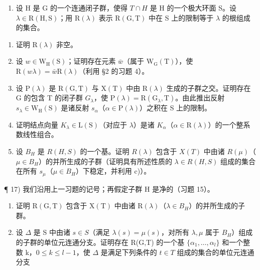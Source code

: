 \begin{enumerate}
\def\labelenumi{\arabic{enumi})}
\setcounter{enumi}{15}
\tightlist
\item
  设 H 是 G 的一个连通闭子群，使得 \(T \cap H\) 是 H 的一个极大环面 S。设 \(\lambda \in \mathrm{R}(\mathrm{H}, \mathrm{S})\)；用 \(\mathrm{R}(\lambda)\) 表示 \(\mathrm{R}(\mathrm{G}, \mathrm{T})\) 中在 S 上的限制等于 \(\lambda\) 的根组成的集合。
\end{enumerate}

\begin{enumerate}
\def\labelenumi{\alph{enumi})}
\item
  证明 \(\mathrm{R}(\lambda)\) 非空。
\item
  设 \(w \in \mathrm{W}_{\mathrm{H}}(\mathrm{S})\)；证明存在元素 \(\bar{w}\)（属于 \(\mathrm{W}_{\mathrm{G}}(\mathrm{T})\)），使 \(\mathrm{R}(w\lambda) = \bar{w}\mathrm{R}(\lambda)\)（利用 §2 的习题 4）。
\item
  设 \(\mathrm{P}(\lambda)\) 是 \(\mathrm{R}(\mathrm{G},\mathrm{T})\) 与 \(\mathrm{X}(\mathrm{T})\) 中由 \(\mathrm{R}(\lambda)\) 生成的子群之交。证明存在 G 的包含 T 的闭子群 \(G_{\lambda}\)，使 \(\mathrm{P}(\lambda)=\mathrm{R}(\mathrm{G}_{\lambda},\mathrm{T})\)。由此推出反射 \(s_{\lambda}\in\mathrm{W}_{\mathrm{H}}(\mathrm{S})\) 是诸反射 \(s_{\alpha}\)（\(\alpha\in\mathrm{P}(\lambda)\)）之积在 S 上的限制。
\item
  证明结点向量 \(K_{\lambda} \in \mathrm{L}(\mathrm{S})\)（对应于 \(\lambda\)）是诸 \(K_{\alpha}\)（\(\alpha \in \mathrm{R}(\lambda)\)）的一个整系数线性组合。
\item
  设 \(B_{H}\) 是 \(R(H,S)\) 的一个基。证明 \(R(\lambda)\) 包含于 \(X(T)\) 中由诸 \(R(\mu)\)（\(\mu \in B_{H}\)）的并所生成的子群（证明具有所述性质的 \(\lambda \in R(H,S)\) 组成的集合在所有 \(s_{\mu}\)（\(\mu \in B_{H}\)）下稳定，并利用 c)）。
\end{enumerate}

¶ 17) 我们沿用上一习题的记号；再假定子群 H 是净的（习题 15）。

\begin{enumerate}
\def\labelenumi{\alph{enumi})}
\item
  证明 \(\mathrm{R}(\mathrm{G},\mathrm{T})\) 包含于 \(\mathrm{X}(\mathrm{T})\) 中由诸 \(\mathrm{R}(\lambda)\)（\(\lambda\in B_{H}\)）的并所生成的子群。
\item
  设 \(\Delta\) 是 S 中由诸 \(s \in S\)（满足 \(\lambda(s) = \mu(s)\)，对所有 \(\lambda, \mu\) 属于 \(B_{H}\)）组成的子群的单位元连通分支。证明存在 R(G,T) 的一个基 \(\{\alpha_{1}, \ldots, \alpha_{l}\}\) 和一个整数 k，\(0 \leq k \leq l - 1\)，使 \(\Delta\) 是满足下列条件的 \(t \in T\) 组成的集合的单位元连通分支
\end{enumerate}

